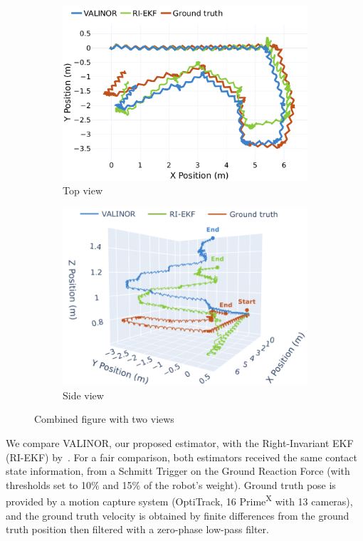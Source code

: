 \documentclass{IJCAS}
\begin{document}
\begin{figure}[htbp]
  \centering
  \begin{subfigure}{\linewidth}
    \centering
    \includegraphics[width=0.85\linewidth]{Uploaded/Images/trajectory_rhps1.pdf}
    \caption{Top view}
    \label{fig:top}
  \end{subfigure}
  \begin{subfigure}{\linewidth}
    \centering
    \includegraphics[width=0.9\linewidth]{Uploaded/Images/trajectory_rhps1_3d.png}
    \caption{Side view}
    \label{fig:side}
  \end{subfigure}
  \caption{Combined figure with two views}
  \label{fig:combined}
\end{figure}

\noindent We compare VALINOR, our proposed estimator, with the Right-Invariant EKF (RI-EKF) by~\cite{Hartley2020RIEKF}. For a fair comparison, both estimators received the same contact state information, from a Schmitt Trigger on the Ground Reaction Force (with thresholds set to 10\% and 15\% of the robot's weight).
Ground truth pose is provided by a motion capture system (OptiTrack, 16 Prime\textsuperscript{X} with 13 cameras), and the ground truth velocity is obtained by finite differences from the ground truth position then filtered with a zero-phase low-pass filter.
\end{document}
